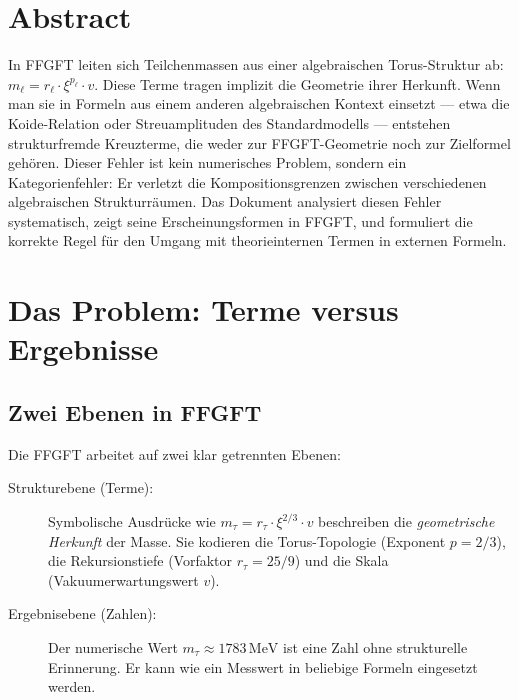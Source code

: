 
\section*{Abstract}

In FFGFT leiten sich Teilchenmassen aus einer algebraischen Torus-Struktur ab:
$m_\ell = r_\ell \cdot \xi^{p_\ell} \cdot v$. Diese Terme tragen implizit die
Geometrie ihrer Herkunft. Wenn man sie in Formeln aus einem anderen algebraischen
Kontext einsetzt — etwa die Koide-Relation oder Streuamplituden des Standardmodells
— entstehen strukturfremde Kreuzterme, die weder zur FFGFT-Geometrie noch zur
Zielformel gehören. Dieser Fehler ist kein numerisches Problem, sondern ein
Kategorienfehler: Er verletzt die Kompositionsgrenzen zwischen verschiedenen
algebraischen Strukturräumen. Das Dokument analysiert diesen Fehler systematisch,
zeigt seine Erscheinungsformen in FFGFT, und formuliert die korrekte Regel für
den Umgang mit theorieinternen Termen in externen Formeln.

\section{Das Problem: Terme versus Ergebnisse}

\subsection{Zwei Ebenen in FFGFT}

Die FFGFT arbeitet auf zwei klar getrennten Ebenen:

\begin{description}
  \item[Strukturebene (Terme):] Symbolische Ausdrücke wie
    $m_\tau = r_\tau \cdot \xi^{2/3} \cdot v$ beschreiben die
    \emph{geometrische Herkunft} der Masse. Sie kodieren die
    Torus-Topologie (Exponent $p = 2/3$), die Rekursionstiefe
    (Vorfaktor $r_\tau = 25/9$) und die Skala (Vakuumerwartungswert $v$).
  \item[Ergebnisebene (Zahlen):] Der numerische Wert
    $m_\tau \approx 1783\,\text{MeV}$ ist eine Zahl ohne strukturelle
    Erinnerung. Er kann wie ein Messwert in beliebige Formeln eingesetzt werden.
\end{description}

